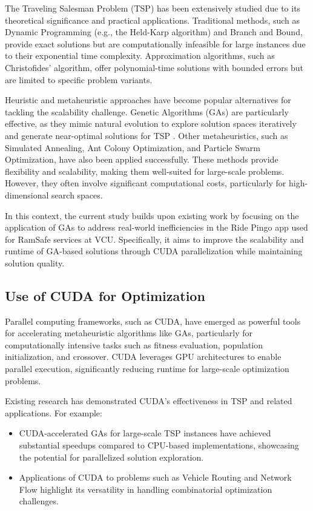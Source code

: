 \documentclass[conference]{IEEEtran}
\begin{document}
The Traveling Salesman Problem (TSP) has been extensively studied due to its theoretical significance and practical applications. Traditional methods, such as Dynamic Programming (e.g., the Held-Karp algorithm\cite{bellman1962dynamic, held1962dynamic}) and Branch and Bound\cite{land2010automatic}, provide exact solutions but are computationally infeasible for large instances due to their exponential time complexity. Approximation algorithms, such as Christofides’ algorithm, offer polynomial-time solutions with bounded errors but are limited to specific problem variants\cite{christofides2022worst}.

Heuristic and metaheuristic approaches have become popular alternatives for tackling the scalability challenge. Genetic Algorithms (GAs) are particularly effective, as they mimic natural evolution to explore solution spaces iteratively and generate near-optimal solutions for TSP \cite{grefenstette2014genetic}. Other metaheuristics, such as Simulated Annealing, Ant Colony Optimization, and Particle Swarm Optimization, have also been applied successfully. These methods provide flexibility and scalability, making them well-suited for large-scale problems. However, they often involve significant computational costs, particularly for high-dimensional search spaces\cite{altenberg1995schema}.

In this context, the current study builds upon existing work by focusing on the application of GAs to address real-world inefficiencies in the Ride Pingo app used for RamSafe services at VCU. Specifically, it aims to improve the scalability and runtime of GA-based solutions through CUDA parallelization while maintaining solution quality.

\subsection{Use of CUDA for Optimization}

Parallel computing frameworks, such as CUDA, have emerged as powerful tools for accelerating metaheuristic algorithms like GAs, particularly for computationally intensive tasks such as fitness evaluation, population initialization, and crossover. CUDA leverages GPU architectures to enable parallel execution, significantly reducing runtime for large-scale optimization problems.

Existing research has demonstrated CUDA’s effectiveness in TSP and related applications. For example:
\begin{itemize}
    \item CUDA-accelerated GAs for large-scale TSP instances have achieved substantial speedups compared to CPU-based implementations, showcasing the potential for parallelized solution exploration\cite{chen2011cuda, fujimoto2011highly}.
    \item Applications of CUDA to problems such as Vehicle Routing and Network Flow highlight its versatility in handling combinatorial optimization challenges\cite{abbasi2020efficient}.
\end{itemize}
\end{document}
